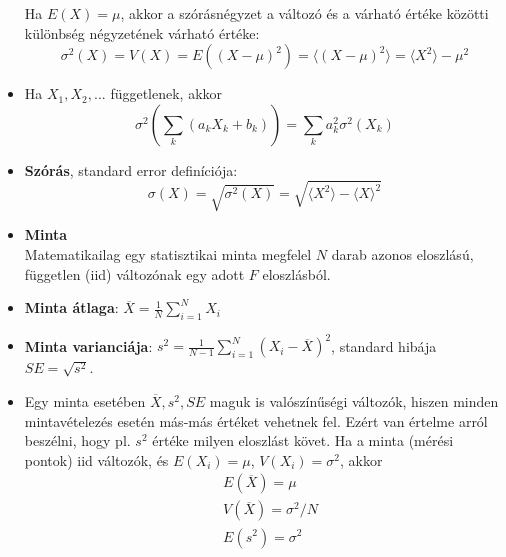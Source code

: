 \documentclass[12pt]{article}
\theoremstyle{plain}
\begin{document}
\begin{itemize}
    Ha $E(X)=\mu$, akkor a szórásnégyzet a változó és a várható értéke közötti különbség négyzetének várható értéke:
    \begin{equation*}
        \sigma^2(X) = V(X) = E((X-\mu)^2) = \langle (X-\mu)^2 \rangle = \langle X^2 \rangle - \mu^2
    \end{equation*}
    \item Ha $X_1, X_2, ...$ függetlenek, akkor 
        \begin{equation*}
            \sigma^2\left( \sum\limits_k(a_kX_k + b_k) \right) = \sum\limits_k a_k^2\sigma^2(X_k)
        \end{equation*}
    \item \textbf{Szórás}, standard error definíciója:
        \begin{equation*}
            \sigma(X) = \sqrt{\sigma^2(X)} = \sqrt{\langle X^2 \rangle - \langle X \rangle^2}
        \end{equation*}
    \item \textbf{Minta}\\
    Matematikailag egy statisztikai minta megfelel $N$ darab azonos eloszlású, független (iid) változónak egy adott $F$ eloszlásból.
    \item \textbf{Minta átlaga}: ${\displaystyle\overline{X} = \frac{1}{N}\sum\limits_{i=1}^{N}X_i}$
    \item \textbf{Minta varianciája}: ${\displaystyle s^2 = \frac{1}{N-1}\sum\limits_{i=1}^{N}(X_i-\overline{X})^2}$,
    standard hibája $SE = \sqrt{s^2}$.
    \item Egy minta esetében $\overline{X}, s^2, SE$ maguk is valószínűségi változók, hiszen minden mintavételezés esetén más-más
    értéket vehetnek fel. Ezért van értelme arról beszélni, hogy pl. $s^2$ értéke milyen eloszlást követ.
    Ha a minta (mérési pontok) iid változók, és $E(X_i)=\mu$, $V(X_i)=\sigma^2$, akkor 
    \begin{align*}
        & E(\overline{X}) = \mu \\
        & V(\overline{X}) = \sigma^2/N \\
        & E(s^2) = \sigma^2
    \end{align*}
\end{itemize}
\end{document}
